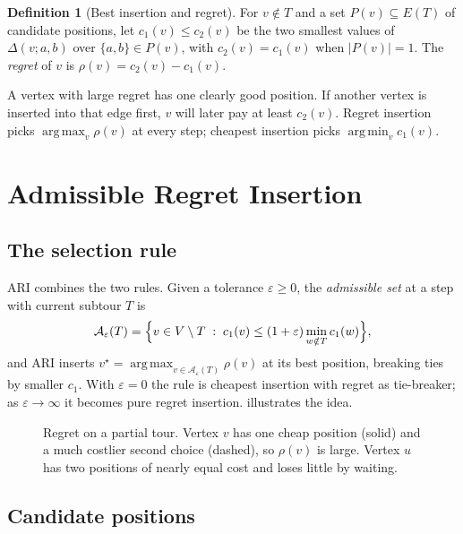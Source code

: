 \documentclass[11pt]{article}
\theoremstyle{definition}
\newtheorem{definition}{Definition}
\theoremstyle{remark}
\DeclareMathOperator*{\argmin}{arg\,min}
\DeclareMathOperator*{\argmax}{arg\,max}
\begin{document}
\begin{definition}[Best insertion and regret]
\label{def:regret}
For $v \notin T$ and a set $P(v) \subseteq E(T)$ of candidate positions, let $c_1(v) \le c_2(v)$ be the two smallest values of $\Delta(v; a, b)$ over $\{a,b\} \in P(v)$, with $c_2(v) = c_1(v)$ when $|P(v)| = 1$. The \emph{regret} of $v$ is $\rho(v) = c_2(v) - c_1(v)$.
\end{definition}

A vertex with large regret has one clearly good position. If another vertex is inserted into that edge first, $v$ will later pay at least $c_2(v)$. Regret insertion picks $\argmax_v \rho(v)$ at every step; cheapest insertion picks $\argmin_v c_1(v)$.

\section{Admissible Regret Insertion}
\label{sec:method}

\subsection{The selection rule}

ARI combines the two rules. Given a tolerance $\varepsilon \ge 0$, the \emph{admissible set} at a step with current subtour $T$ is
\begin{equation}
  \mathcal{A}_\varepsilon(T) = \Bigl\{ v \in V \setminus T \;:\; c_1(v) \le (1 + \varepsilon) \min_{w \notin T} c_1(w) \Bigr\},
  \label{eq:admissible}
\end{equation}
and ARI inserts $v^\star = \argmax_{v \in \mathcal{A}_\varepsilon(T)} \rho(v)$ at its best position, breaking ties by smaller $c_1$. With $\varepsilon = 0$ the rule is cheapest insertion with regret as tie-breaker; as $\varepsilon \to \infty$ it becomes pure regret insertion.  illustrates the idea.

\begin{figure}[t]
  \centering
  
  \caption{Regret on a partial tour. Vertex $v$ has one cheap position (solid) and a much costlier second choice (dashed), so $\rho(v)$ is large. Vertex $u$ has two positions of nearly equal cost and loses little by waiting.}
  \label{fig:regret}
\end{figure}

\subsection{Candidate positions}
\end{document}
